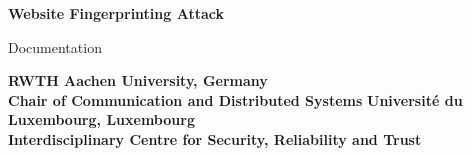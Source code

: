 \titlehead{
	\centering
	\vbox{
	\vskip 5mm
	}
} %
\begin{titlepage}

\let\footnotesize\small \let\footnoterule\relax

\hbox{}
\vfill

\centering

\begin{doublespace} 
{ \huge\textbf{\textsf{Website Fingerprinting Attack\\}}}
\end{doublespace}
\vskip 3cm

{\large Documentation}
\vskip 5cm

\textbf{RWTH Aachen University, Germany\\[5pt]
        Chair of Communication and Distributed Systems}
\vskip 0.2cm
\textbf{Université du Luxembourg, Luxembourg\\[5pt]
        Interdisciplinary Centre for Security, Reliability and Trust}

\vskip 1.2cm

\end{titlepage}

